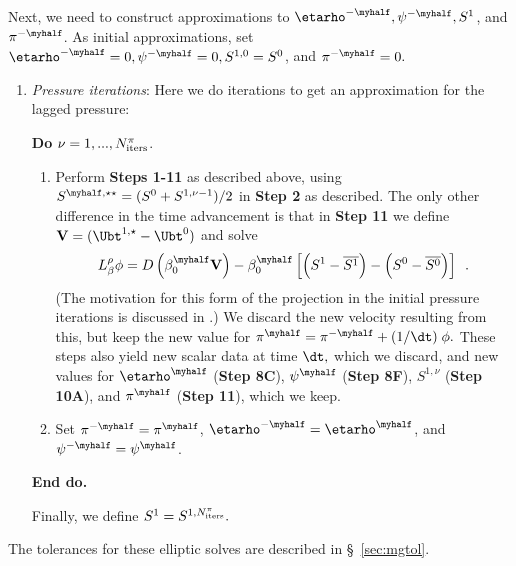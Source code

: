 Next, we need to construct approximations to $\etarho^{-\myhalf}, \psi^{-\myhalf}, S^1$,
and $\pi^{-\myhalf}$.  As initial approximations, set 
$\etarho^{-\myhalf}=0, \psi^{-\myhalf}=0, S^{1,0}=S^0$, and $\pi^{-\myhalf}=0.$
\begin{enumerate}
\renewcommand{\theenumi}{{\bf \alph{enumi}}}
\renewcommand{\labelenumii}{\roman{enumii}.}
\addtocounter{enumi}{2}
\item {\it Pressure iterations}: Here we do  iterations to get an
  approximation for the lagged pressure:

  {\bf Do} {$\nu = 1,...,N_{\rm iters}^{\pi}$.}
  \begin{enumerate}
  \item Perform {\bf Steps 1-11} as described above, using 
    $S^{\myhalf,\star\star} = (S^0 + S^{1,\nu-1})/2$ in {\bf Step 2} as described.
    The only other difference in the time advancement is that in {\bf Step 11}
    we define ${\bf V} = (\Ubt^{1,\star} - \Ubt^0)$ and solve
    \begin{equation}  L_\beta^\rho \phi = D \left ( \beta_0^{\myhalf} {\bf V} \right) - \beta_0^{\myhalf} \left[ \left(S^{1}-\overline{S^{1}}\right) - \left(S^{0}-\overline{S^{0}}\right) \right] \enskip . 
    \end{equation}
    (The motivation for this form of the projection in the initial pressure iterations
    is discussed in \cite{almgren:bell:crutchfield}.)
      We discard the new velocity resulting from this, but keep the new  
      value for $\pi^{\myhalf} = \pi^{-\myhalf} + (1 / \dt) \; \phi.$  
      These steps also yield new scalar data at time $\dt,$ which
      we discard, and new values for $\etarho^{\myhalf}$ ({\bf Step 8C}), 
      $\psi^{\myhalf}$ ({\bf Step 8F}), 
      $S^{1,\nu}$ ({\bf Step 10A}), and $\pi^{\myhalf}$ ({\bf Step 11}), which we keep.
    \item Set $\pi^{-\myhalf} = \pi^{\myhalf}$, $\etarho^{-\myhalf} = \etarho^{\myhalf}$,
      and $\psi^{-\myhalf} = \psi^{\myhalf}$. 
    \end{enumerate}
    
    {\bf End do.}
    
    Finally, we define $S^1 = S^{1,N_{\rm iters}^\pi}.$
    
  \end{enumerate}

The tolerances for these elliptic solves are described in \S~\ref{sec:mgtol}.



